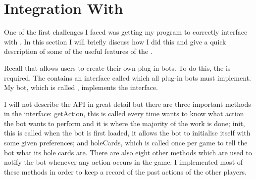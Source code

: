 \section{Integration With \pap}					%





One of the first challenges I faced was getting my program to correctly interface with \pap. In this section I will briefly discuss how I did this and give a quick description of some of the useful features of the \meer.

Recall that \pa allows users to create their own plug-in bots. To do this, the \meer is required. The \meer contains an interface called \player which all plug-in bots must implement. My bot, which is called \mbt, implements the \player interface.

I will not describe the API in great detail but there are three important methods in the \player interface: getAction, this is called every time \pa wants to know what action the bot wants to perform and it is where the majority of the work is done; init, this is called when the bot is first loaded, it allows the bot to initialise itself with some given preferences; and holeCards, which is called once per game to tell the bot what its hole cards are. There are also eight other methods which are used to notify the bot whenever any action occurs in the game. I implemented most of these methods in order to keep a record of the past actions of the other players.


